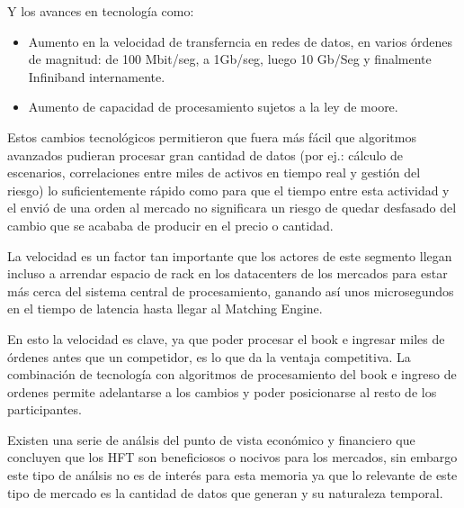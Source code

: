 Y los avances en tecnología como:
\begin{itemize}
 \item Aumento en la velocidad de transferncia en redes de datos, en varios
órdenes de magnitud: de 100 Mbit/seg, a 1Gb/seg, luego 10 Gb/Seg y finalmente
Infiniband internamente.
 \item Aumento de capacidad de procesamiento sujetos a la ley de moore.
\end{itemize}

Estos cambios tecnológicos permitieron que fuera más fácil que algoritmos
avanzados pudieran procesar gran cantidad de datos (por ej.: cálculo de
escenarios, correlaciones entre miles de activos en tiempo real y gestión del
riesgo) lo suficientemente rápido como para que el tiempo entre esta actividad
y el envió de una orden al mercado no significara un riesgo de quedar desfasado
del cambio que se acababa de producir en el precio o cantidad.

La velocidad es un factor tan importante que los actores de este segmento
llegan incluso a arrendar espacio de rack en los datacenters de los mercados
para estar más cerca del sistema central de procesamiento, ganando así unos
microsegundos en el tiempo de latencia hasta llegar al Matching Engine. 

En esto la velocidad es clave, ya que poder procesar el book e ingresar miles
de órdenes antes que un competidor, es lo que da la ventaja competitiva. La
combinación de tecnología con algoritmos de procesamiento del book e ingreso de
ordenes permite adelantarse a los cambios y poder posicionarse al resto de los
participantes. 
 
Existen una serie de análsis del punto de vista económico y financiero que
concluyen que los HFT son beneficiosos o nocivos para los mercados, sin embargo
este tipo de análsis no es de interés para esta memoria ya que lo relevante de
este tipo de mercado es la cantidad de datos que generan y su naturaleza
temporal.




